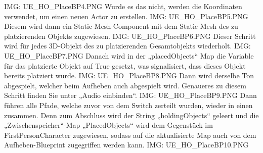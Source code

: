 {IMG: UE_HO_PlaceBP4.PNG}
Wurde es das nicht, werden die Koordinaten verwendet, um einen neuen Actor zu erstellen.
{IMG: UE_HO_PlaceBP5.PNG}
Diesem wird dann ein Static Mesh Component mit dem Static Mesh des zu platzierenden Objekts zugewiesen.
{IMG: UE_HO_PlaceBP6.PNG}
Dieser Schritt wird für jedes 3D-Objekt des zu platzierenden Gesamtobjekts wiederholt.
{IMG: UE_HO_PlaceBP7.PNG}
Danach wird in der „placedObjects“ Map die Variable für das platzierte Objekt auf True gesetzt, was signalisiert, dass dieses Objekt bereits platziert wurde.
{IMG: UE_HO_PlaceBP8.PNG}
Dann wird derselbe Ton abgespielt, welcher beim Aufheben auch abgespielt wird. Genaueres zu diesem Schritt finden Sie unter „Audio einbinden“.
{IMG: UE_HO_PlaceBP9.PNG}
Dann führen alle Pfade, welche zuvor von dem Switch zerteilt wurden, wieder in einen zusammen. Denn zum Abschluss wird der String „holdingObjects“ geleert und die „Zwischenspeicher“-Map „PlacedObjects“ wird dem Gegenstück im FirstPersonCharacter zugewiesen, sodass auf die aktualisierte Map auch von dem Aufheben-Blueprint zugegriffen werden kann.
{IMG: UE_HO_PlaceBP10.PNG}

